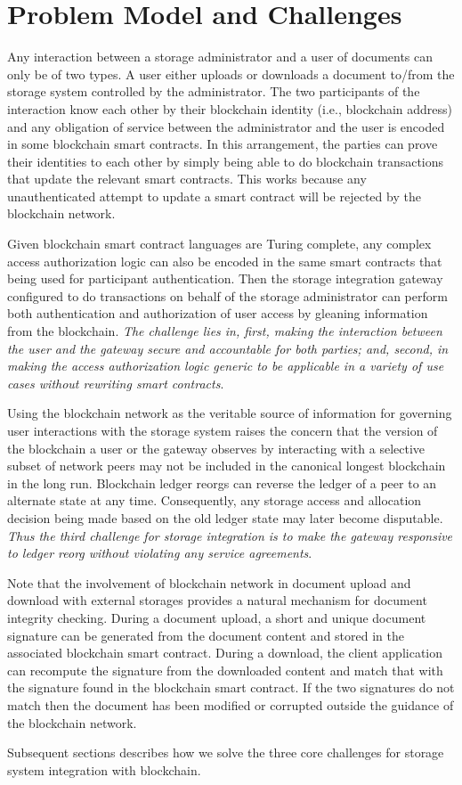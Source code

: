 \section{Problem Model and Challenges}
\label{s-scope}
Any interaction between a storage administrator and a user of documents can only be of two types. A user either uploads or downloads a document to/from the storage system controlled by the administrator. The two participants of the interaction know each other by their blockchain identity (i.e., blockchain address) and any obligation of service between the administrator and the user is encoded in some blockchain smart contracts. In this arrangement, the parties can prove their identities to each other by simply being able to do blockchain transactions that update the relevant smart contracts. This works because any unauthenticated attempt to update a smart contract will be rejected by the blockchain network.      

Given blockchain smart contract languages are Turing complete, any complex access authorization logic can also be encoded in the same smart contracts that being used for participant authentication. Then the storage integration gateway configured to do transactions on behalf of the storage administrator can perform both authentication and authorization of user access by gleaning information from the blockchain. \textit{The challenge lies in, first, making the interaction between the user and the gateway secure and accountable for both parties; and, second, in making the access authorization logic generic to be applicable in a variety of use cases without rewriting smart contracts}.          

Using the blockchain network as the veritable source of information for governing user interactions with the storage system raises the concern that the version of the blockchain a user or the gateway observes by interacting with a selective subset of network peers may not be included in the canonical longest blockchain in the long run. Blockchain ledger reorgs \cite{reorg} can reverse the ledger of a peer to an alternate state at any time. Consequently, any storage access and allocation decision being made based on the old ledger state may later become disputable. \textit{Thus the third challenge for storage integration is to make the gateway responsive to ledger reorg without violating any service agreements}.         

Note that the involvement of blockchain network in document upload and download with external storages provides a natural mechanism for document integrity checking. During a document upload, a short and unique document signature can be generated from the document content and stored in the associated blockchain smart contract. During a download, the client application can recompute the signature from the downloaded content and match that with the signature found in the blockchain smart contract. If the two signatures do not match then the document has been modified or corrupted outside the guidance of the blockchain network.  

Subsequent sections describes how we solve the three core challenges for storage system integration with blockchain.
